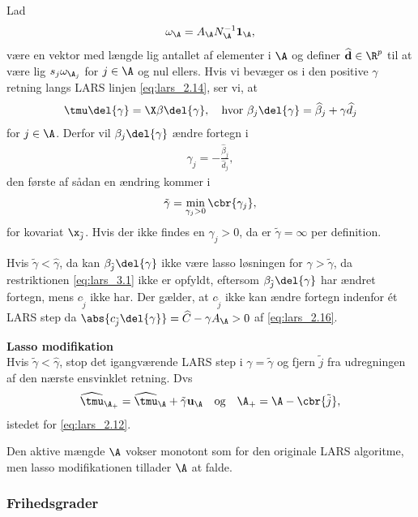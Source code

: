 Lad
\begin{align*}
\omega_\A = A_\A N_\A^{-1} \mathbf{1}_\A,
\end{align*}
være en vektor med længde lig antallet af elementer i \(\A\) og definer \(\widehat{\mathbf{d}} \in \R^p\) til at være lig \(s_j \omega_{\A_j}\) for \(j \in \A\) og nul ellers.
Hvis vi bevæger os i den positive \(\gamma\) retning langs LARS linjen \eqref{eq:lars_2.14}, ser vi, at
\begin{align*}
\tmu \del{\gamma} = \X \beta \del{\gamma}, \quad \text{hvor } \beta_j \del{\gamma} = \widehat{\beta}_j + \gamma \widehat{d}_j
\end{align*}
for \(j \in \A\).
Derfor vil \(\beta_j \del{\gamma}\) ændre fortegn i
\begin{align*}
\gamma_j = -\frac{\widehat{\beta}_j}{\widehat{d}_j},
\end{align*}
den første af sådan en ændring kommer i
\begin{align*}
\tilde{\gamma} = \min_{\gamma_j > 0} \cbr{\gamma_j},
\end{align*}
for kovariat \(\x_{\tilde{j}}\).
Hvis der ikke findes en \(\gamma_j > 0\), da er \(\tilde{\gamma}=\infty\) per definition.

Hvis \(\tilde{\gamma} < \widehat{\gamma}\), da kan \(\beta_{\tilde{j}} \del{\gamma}\) ikke være lasso løsningen for \(\gamma > \tilde{\gamma}\), da restriktionen \eqref{eq:lars_3.1} ikke er opfyldt, eftersom \(\beta_{\tilde{j}} \del{\gamma}\) har ændret fortegn, mens \(c_{\tilde{j}}\) ikke har.
Der gælder, at \(c_{\tilde{j}}\) ikke kan ændre fortegn indenfor ét LARS step da \(\abs{c_{\tilde{j}} \del{\gamma}} = \widehat{C} - \gamma A_\A> 0\) af \eqref{eq:lars_2.16}.

\textbf{Lasso modifikation} \\
Hvis \(\tilde{\gamma} < \hat{\gamma}\), stop det igangværende LARS step i \(\gamma = \tilde{\gamma}\) og fjern \(\tilde{j}\) fra udregningen af den nærste ensvinklet retning.
Dvs
\begin{align*}
\widehat{\tmu}_{\A_+} = \widehat{\tmu}_\A + \tilde{\gamma} \mathbf{u}_\A \quad \text{og} \quad \A_+ = \A - \cbr{\tilde{j}},
\end{align*}
istedet for \eqref{eq:lars_2.12}.

Den aktive mængde \(\A\) vokser monotont som for den originale LARS algoritme, men lasso modifikationen tillader \(\A\) at falde.

\subsubsection{Frihedsgrader}

